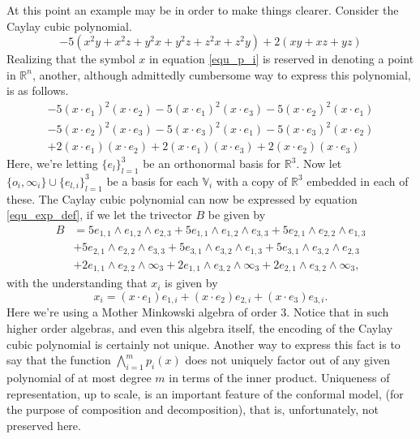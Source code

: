\documentclass{birkjour}
\theoremstyle{definition}
\theoremstyle{remark}
\numberwithin{equation}{section}
\newcommand{\R}{\mathbb{R}}
\newcommand{\V}{\mathbb{V}}
\newcommand{\nvai}{\infty}
\newcommand{\nvao}{o}
\begin{document}
At this point an example may be in order to make things clearer.
Consider the Caylay cubic polynomial.
\begin{equation*}
-5(x^2y + x^2z + y^2x + y^2z + z^2x + z^2y) + 2(xy + xz + yz)
\end{equation*}
Realizing that the symbol $x$ in equation \eqref{equ_p_i} is reserved in denoting
a point in $\R^n$, another, although admittedly cumbersome way to express this polynomial, is as follows.
\begin{align*}
-5(x\cdot e_1)^2(x\cdot e_2) - 5(x\cdot e_1)^2(x\cdot e_3) -5(x\cdot e_2)^2(x\cdot e_1) \\
 -5 (x\cdot e_2)^2(x\cdot e_3) -5(x\cdot e_3)^2(x\cdot e_1) -5 (x\cdot e_3)^2(x\cdot e_2) \\
+ 2(x\cdot e_1)(x\cdot e_2) + 2(x\cdot e_1)(x\cdot e_3) + 2(x\cdot e_2)(x\cdot e_3)
\end{align*}
Here, we're letting $\{e_l\}_{l=1}^3$ be an orthonormal basis for $\R^3$.  Now let
$\{\nvao_i,\nvai_i\}\cup\{e_{l,i}\}_{l=1}^3$ be a basis for each $\V_i$ with a copy of $\R^3$
embedded in each of these.  The Caylay cubic polynomial can now be expressed by
equation \eqref{equ_exp_def}, if we let the trivector $B$ be given by
\begin{align*}
B &= 5e_{1,1}\wedge e_{1,2}\wedge e_{2,3} + 5e_{1,1}\wedge e_{1,2}\wedge e_{3,3} + 5e_{2,1}\wedge e_{2,2}\wedge e_{1,3} \\
 &+ 5e_{2,1}\wedge e_{2,2}\wedge e_{3,3} + 5e_{3,1}\wedge e_{3,2}\wedge e_{1,3} + 5e_{3,1}\wedge e_{3,2}\wedge e_{2,3} \\
 & +2e_{1,1}\wedge e_{2,2}\wedge \nvai_{3} + 2e_{1,1}\wedge e_{3,2}\wedge \nvai_{3} + 2e_{2,1}\wedge e_{3,2}\wedge \nvai_{3},
\end{align*}
with the understanding that $x_i$ is given by
\begin{equation*}
x_i = (x\cdot e_1)e_{1,i} + (x\cdot e_2)e_{2,i} + (x\cdot e_3)e_{3,i}.
\end{equation*}
Here we're using a Mother Minkowski algebra of order 3.  Notice that in such higher order
algebras, and even this algebra itself, the encoding of the Caylay cubic polynomial is certainly not unique.
Another way to express this fact is to say that the function $\bigwedge_{i=1}^m p_i(x)$ does
not uniquely factor out of any given polynomial of at most degree $m$ in terms of the inner product.
Uniqueness of representation, up to scale, is an important feature of the conformal model, (for the
purpose of composition and decomposition), that is,
unfortunately, not preserved here.
\end{document}
